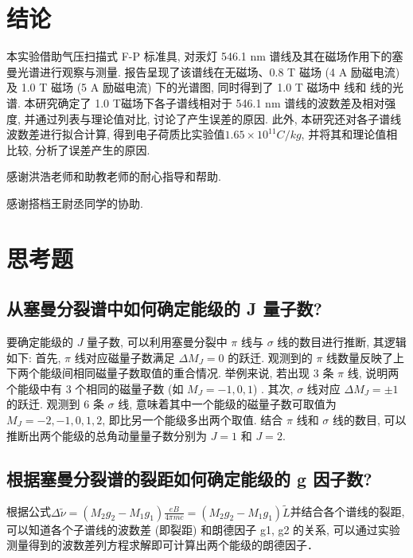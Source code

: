 \documentclass[font=default]{mpltx}
\begin{document}
 
\section{结论}
  本实验借助气压扫描式 F-P 标准具, 
  对汞灯 546.1 nm 谱线及其在磁场作用下的塞曼光谱进行观察与测量.
  报告呈现了该谱线在无磁场、0.8 T 磁场 (4 A 励磁电流) 及 1.0 T 磁场 (5 A 励磁电流) 下的光谱图, 
  同时得到了 1.0 T 磁场中 \pi 线和 \sigma 线的光谱. 
  本研究确定了 1.0 T磁场下各子谱线相对于 546.1 nm 谱线的波数差及相对强度, 
  并通过列表与理论值对比, 讨论了产生误差的原因.
  此外, 本研究还对各子谱线波数差进行拟合计算, 得到电子荷质比实验值$1.65 \times 10^{11} C/kg$, 并将其和理论值相比较, 分析了误差产生的原因.

\begin{acknowledgments}
  感谢洪浩老师和助教老师的耐心指导和帮助.
  \par
  感谢搭档王尉丞同学的协助.
\end{acknowledgments}



\clearpage %
\appendix %
\section{思考题}\label{app:exercise}
\subsection{从塞曼分裂谱中如何确定能级的 J 量子数?}
要确定能级的 $J$ 量子数, 可以利用塞曼分裂中 $\pi$ 线与 $\sigma$ 线的数目进行推断, 其逻辑如下:
首先, $\pi$ 线对应磁量子数满足 $\Delta M_J = 0$ 的跃迁. 
观测到的 $\pi$ 线数量反映了上下两个能级间相同磁量子数取值的重合情况. 
举例来说, 若出现 3 条 $\pi$ 线, 说明两个能级中有 3 个相同的磁量子数 (如 $M_J = -1, 0, 1$) . 
其次, $\sigma$ 线对应 $\Delta M_J = \pm 1$ 的跃迁. 
观测到 6 条 $\sigma$ 线, 意味着其中一个能级的磁量子数可取值为 $M_J = -2, -1, 0, 1, 2$, 即比另一个能级多出两个取值. 
结合 $\pi$ 线和 $\sigma$ 线的数目, 
可以推断出两个能级的总角动量量子数分别为 $J = 1$ 和 $J = 2$. 
\subsection{根据塞曼分裂谱的裂距如何确定能级的 g 因子数?}
根据公式$\Delta \widetilde{\nu} = (M_2 g_2 - M_1 g_1) \frac{eB}{4\pi m c} = (M_2 g_2 - M_1 g_1) \widetilde{L}$并结合各个谱线的裂距, 
可以知道各个子谱线的波数差 (即裂距) 和朗德因子 g1, g2 的关系, 可以通过实验测量得到的波数差列方程求解即可计算出两个能级的朗德因子．
\end{document}
